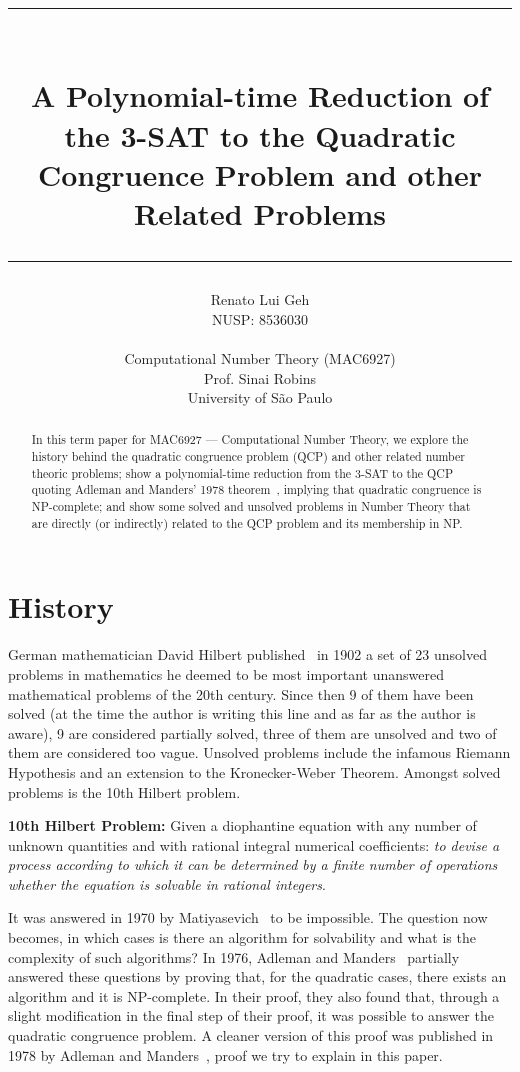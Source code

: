 \documentclass{amsart}
\title{%
  \noindent\rule{13cm}{1.0pt}\\
  \vspace{0.2cm}
  A Polynomial-time Reduction of the 3-SAT to the Quadratic Congruence Problem and other Related Problems
  \noindent\rule{13cm}{0.8pt}
}
\author[]{\normalsize Renato Lui Geh\\\small NUSP\@: 8536030\\\\Computational Number Theory
(MAC6927)\\Prof\@. Sinai Robins\\University of São Paulo\\}
\theoremstyle{plain}
\begin{document}
\begin{abstract}
  In this term paper for MAC6927 --- Computational Number Theory, we explore the history behind the
  quadratic congruence problem (QCP) and other related number theoric problems; show a
  polynomial-time reduction from the 3-SAT to the QCP quoting Adleman and Manders' 1978
  theorem~\cite{qcp2}, implying that quadratic congruence is NP-complete; and show some solved and
  unsolved problems in Number Theory that are directly (or indirectly) related to the QCP problem
  and its membership in NP\@.
  \vspace*{-3.5em}
\end{abstract}

\maketitle

\section{History}

German mathematician David Hilbert published~\cite{hilbert} in 1902 a set of 23 unsolved problems
in mathematics he deemed to be most important unanswered mathematical problems of the 20th century.
Since then 9 of them have been solved (at the time the author is writing this line and as far as
the author is aware), 9 are considered partially solved, three of them are unsolved and two of them
are considered too vague. Unsolved problems include the infamous Riemann Hypothesis and an
extension to the Kronecker-Weber Theorem. Amongst solved problems is the 10th Hilbert problem.

\textbf{10th Hilbert Problem:} Given a diophantine equation with any number of unknown quantities
and with rational integral numerical coefficients: \textit{to devise a process according to which
it can be determined by a finite number of operations whether the equation is solvable in rational
integers}.

It was answered in 1970 by Matiyasevich~\cite{diophantine} to be impossible. The question now
becomes, in which cases is there an algorithm for solvability and what is the complexity of such
algorithms? In 1976, Adleman and Manders~\cite{qcp1} partially answered these questions by proving
that, for the quadratic cases, there exists an algorithm and it is NP-complete. In their proof,
they also found that, through a slight modification in the final step of their proof, it was
possible to answer the quadratic congruence problem. A cleaner version of this proof was published
in 1978 by Adleman and Manders~\cite{qcp2}, proof we try to explain in this paper.
\end{document}
